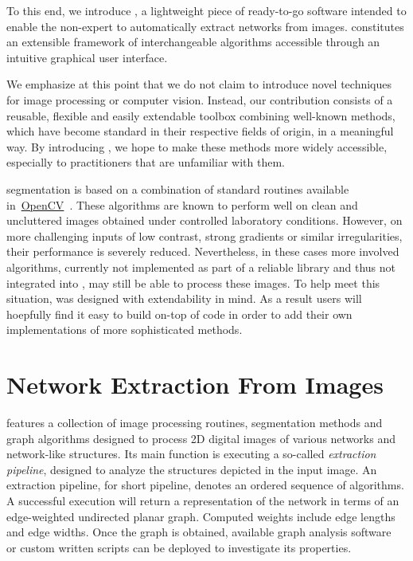 	To this end, we introduce \NEFI, a lightweight piece of ready-to-go software intended to enable the non-expert to automatically extract networks from images. \NEFI constitutes an extensible framework of interchangeable algorithms accessible through an intuitive graphical user interface. 

	We emphasize at this point that we do not claim to introduce novel techniques for image processing or computer vision. Instead, our contribution consists of a reusable, flexible and easily extendable toolbox combining well-known methods, which have become standard in their respective fields of origin, in a meaningful way. By introducing \NEFI, we hope to make these methods more widely accessible, especially to practitioners that are unfamiliar with them.

	\NEFIs segmentation is based on a combination of standard routines available in~\href{http://opencv.org/}{OpenCV}~\cite{opencv}. These algorithms are known to perform well on clean and uncluttered images obtained under controlled laboratory conditions. However, on more challenging inputs of low contrast, strong gradients or similar irregularities, their performance is severely reduced. Nevertheless, in these cases more involved algorithms, currently not implemented as part of a reliable library and thus not integrated into \NEFI, may still be able to process these images. To help meet this situation, \NEFI was designed with extendability in mind. As a result users will hoepfully find it easy to build on-top of \NEFIs code in order to add their own implementations of more sophisticated methods. 

\section{Network Extraction From Images}	%

	\NEFI features a collection of image processing routines, segmentation methods and graph algorithms designed to process 2D digital images of various networks and network-like structures. Its main function is executing a so-called \emph{extraction pipeline}, designed to analyze the structures depicted in the input image. An extraction pipeline, for short pipeline, denotes an ordered sequence of algorithms. A successful execution will return a representation of the network in terms of an edge-weighted undirected planar graph. Computed weights include edge lengths and edge widths. Once the graph is obtained, available graph analysis software~\cite{ICWSM09154,snap,batagelj1998pajek,5437689,loscalzo2008social,hagberg2008exploring} or custom written scripts can be deployed to investigate its properties.

